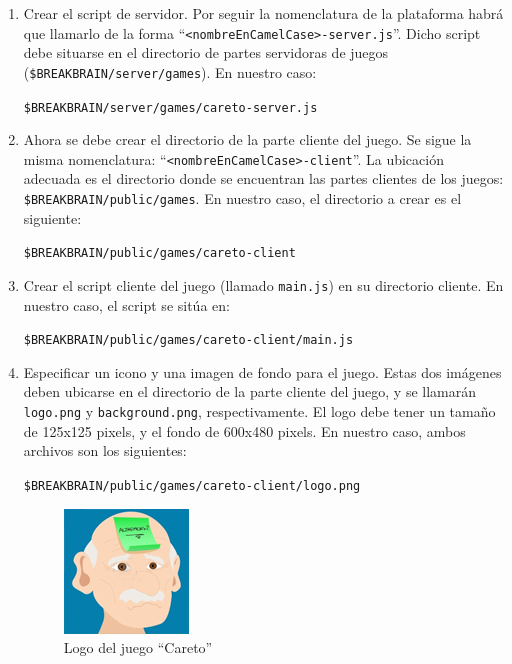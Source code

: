\begin{enumerate}
\item Crear el script de servidor. Por seguir la nomenclatura de la plataforma habrá que llamarlo de la forma ``{\tt <nombreEnCamelCase>-server.js}''. Dicho script debe situarse en el directorio de partes servidoras de juegos ({\tt \$BREAKBRAIN/server/games}). En nuestro caso:
  \begin{center}
    {\tt \$BREAKBRAIN/server/games/careto-server.js}
  \end{center}

\item Ahora se debe crear el directorio de la parte cliente del juego. Se sigue la misma nomenclatura: ``{\tt <nombreEnCamelCase>-client}''. La ubicación adecuada es el directorio donde se encuentran las partes clientes de los juegos: {\tt \$BREAKBRAIN/public/games}. En nuestro caso, el directorio a crear es el siguiente:
  \begin{center}
    {\tt \$BREAKBRAIN/public/games/careto-client}
  \end{center}

\item Crear el script cliente del juego (llamado {\tt main.js}) en su directorio cliente. En nuestro caso, el script se sitúa en:
  \begin{center}
    {\tt \$BREAKBRAIN/public/games/careto-client/main.js}
  \end{center}

\item Especificar un icono y una imagen de fondo para el juego. Estas dos imágenes deben ubicarse en el directorio de la parte cliente del juego, y se llamarán {\tt logo.png} y {\tt background.png}, respectivamente. El logo debe tener un tamaño de 125x125 pixels, y el fondo de 600x480 pixels. En nuestro caso, ambos archivos son los siguientes:
  \begin{center}

    {\tt \$BREAKBRAIN/public/games/careto-client/logo.png}\\

    \begin{figure}[H]
      \begin{center}
        \includegraphics[scale=0.7]{images/careto-logo.png}
        \caption{Logo del juego ``Careto''}
      \end{center}
    \end{figure}


\end{center}
\end{enumerate}
